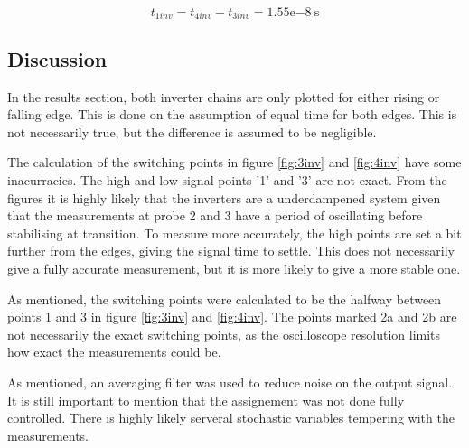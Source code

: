 \documentclass[onecolumn]{article}
\begin{document}
\begin{equation}
    t_{1inv} = t_{4inv} - t_{3inv} = 1.55\mathrm{e}{-8} \ \text{s}
\end{equation}

\subsection{Discussion}
In the results section, both inverter chains are only plotted for either rising or falling edge. This is done on the assumption of equal time for both edges. This is not necessarily true, but the difference is assumed to be negligible.

The calculation of the switching points in figure \ref{fig:3inv} and \ref{fig:4inv} have some inacurracies. The high and low signal points '1' and '3' are not exact. From the figures it is highly likely that the inverters are a underdampened system given that the measurements at probe 2 and 3 have a period of oscillating before stabilising at transition. To measure more accurately, the high points are set a bit further from the edges, giving the signal time to settle. This does not necessarily give a fully accurate measurement, but it is more likely to give a more stable one. 

As mentioned, the switching points were calculated to be the halfway between points 1 and 3 in figure \ref{fig:3inv} and \ref{fig:4inv}. The points marked 2a and 2b are not necessarily the exact switching points, as the oscilloscope resolution limits how exact the measurements could be. 

As mentioned, an averaging filter was used to reduce noise on the output signal. It is still important to mention that the assignement was not done fully controlled. There is highly likely serveral stochastic variables tempering with the measurements.
\end{document}
